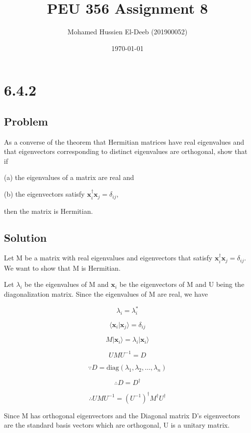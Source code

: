 \documentclass[12pt]{article}
\title{PEU 356 Assignment 8}
\author{Mohamed Hussien El-Deeb (201900052)}
\date{\today}
\begin{document}
\maketitle
\tableofcontents
\hypersetup{linkcolor=RoyalBlue4}

\newpage
\section{6.4.2}

\subsection{Problem}

As a converse of the theorem that Hermitian matrices have real eigenvalues and that eigenvectors corresponding to distinct eigenvalues are orthogonal, show that if

(a) the eigenvalues of a matrix are real and

(b) the eigenvectors satisfy \(\mathbf{x}_i^{\dagger} \mathbf{x}_j=\delta_{i j}\),

then the matrix is Hermitian.

\subsection{Solution}

Let M be a matrix with real eigenvalues and eigenvectors that satisfy \(\mathbf{x}_i^{\dagger} \mathbf{x}_j=\delta_{i j}\). We want to show that M is Hermitian.

Let \(\lambda_i\) be the eigenvalues of M and \(\mathbf{x}_i\) be the eigenvectors of M and U being the diagonalization matrix. Since the eigenvalues of M are real, we have

\[
    \lambda_i=\lambda_i^*
\]

\[
    \langle \mathbf{x}_i | \mathbf{x}_j \rangle = \delta_{i j}
\]

\[
    M | \mathbf{x}_i \rangle = \lambda_i | \mathbf{x}_i \rangle
\]

\[
    U M U^{-1} = D
\]

\[
    \because D = \text{diag}(\lambda_1, \lambda_2, \ldots, \lambda_n)
\]

\[
    \therefore D = D^{\dagger}
\]

\[
    \therefore U M U^{-1} = {\left(U^{-1}\right) }^{\dagger} M^\dagger U^\dagger
\]

Since M has orthogonal eigenvectors and the Diagonal matrix D's eigenvectors are the standard basis vectors which are orthogonal, U is a unitary matrix.
\end{document}

